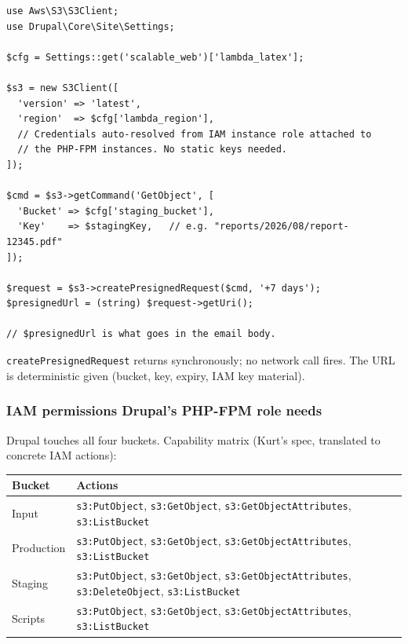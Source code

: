 \documentclass[11pt,letterpaper]{article}
\begin{document}
\begin{lstlisting}[style=worxcode,language=php-like]
use Aws\S3\S3Client;
use Drupal\Core\Site\Settings;

$cfg = Settings::get('scalable_web')['lambda_latex'];

$s3 = new S3Client([
  'version' => 'latest',
  'region'  => $cfg['lambda_region'],
  // Credentials auto-resolved from IAM instance role attached to
  // the PHP-FPM instances. No static keys needed.
]);

$cmd = $s3->getCommand('GetObject', [
  'Bucket' => $cfg['staging_bucket'],
  'Key'    => $stagingKey,   // e.g. "reports/2026/08/report-12345.pdf"
]);

$request = $s3->createPresignedRequest($cmd, '+7 days');
$presignedUrl = (string) $request->getUri();

// $presignedUrl is what goes in the email body.
\end{lstlisting}

\texttt{createPresignedRequest} returns synchronously; no network call fires. The URL is deterministic given (bucket, key, expiry, IAM key material).

\subsubsection{IAM permissions Drupal's PHP-FPM role needs}

Drupal touches all four buckets. Capability matrix (Kurt's spec, translated to concrete IAM actions):

\begin{center}
\begin{tabular}{@{}p{2.4cm}p{11cm}@{}}
\toprule
\textbf{Bucket} & \textbf{Actions} \\
\midrule
Input      & \texttt{s3:PutObject}, \texttt{s3:GetObject}, \texttt{s3:GetObjectAttributes}, \texttt{s3:ListBucket} \\
Production & \texttt{s3:PutObject}, \texttt{s3:GetObject}, \texttt{s3:GetObjectAttributes}, \texttt{s3:ListBucket} \\
Staging    & \texttt{s3:PutObject}, \texttt{s3:GetObject}, \texttt{s3:GetObjectAttributes}, \texttt{s3:DeleteObject}, \texttt{s3:ListBucket} \\
Scripts    & \texttt{s3:PutObject}, \texttt{s3:GetObject}, \texttt{s3:GetObjectAttributes}, \texttt{s3:ListBucket} \\
\bottomrule
\end{tabular}
\end{center}
\end{document}
